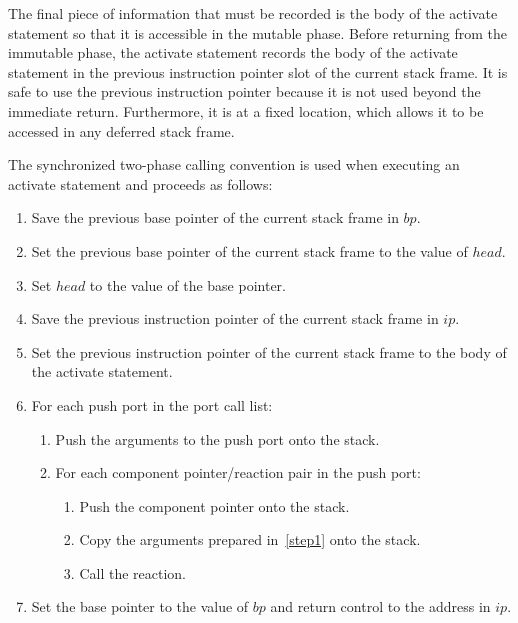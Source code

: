 The final piece of information that must be recorded is the body of the activate statement so that it is accessible in the mutable phase.
Before returning from the immutable phase, the activate statement records the body of the activate statement in the previous instruction pointer slot of the current stack frame.
It is safe to use the previous instruction pointer because it is not used beyond the immediate return.
Furthermore, it is at a fixed location, which allows it to be accessed in any deferred stack frame.

The synchronized two-phase calling convention is used when executing an activate statement and proceeds as follows:
\begin{enumerate}
\item Save the previous base pointer of the current stack frame in $bp$.
\item Set the previous base pointer of the current stack frame to the value of $head$.
\item Set $head$ to the value of the base pointer.
\item Save the previous instruction pointer of the current stack frame in $ip$.
\item Set the previous instruction pointer of the current stack frame to the body of the activate statement.
\item For each push port in the port call list:
  \begin{enumerate}
  \item Push the arguments to the push port onto the stack.\label{step1}
  \item For each component pointer/reaction pair in the push port:
    \begin{enumerate}
    \item Push the component pointer onto the stack.
    \item Copy the arguments prepared in~\ref{step1} onto the stack.
    \item Call the reaction.
    \end{enumerate}
  \end{enumerate}
\item Set the base pointer to the value of $bp$ and return control to the address in $ip$.
\end{enumerate}

